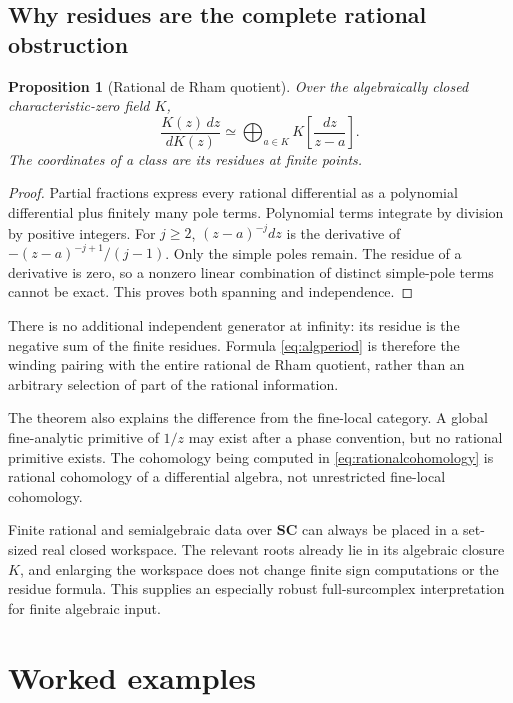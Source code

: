 \documentclass[11pt,letterpaper]{article}
\newtheorem{proposition}[theorem]{Proposition}
\theoremstyle{definition}
\theoremstyle{remark}
\newcommand{\SC}{\mathbf{SC}}
\numberwithin{equation}{section}
\begin{document}
\subsection{Why residues are the complete rational obstruction}
\begin{proposition}[Rational de Rham quotient]\label{prop:rationalcohomology}
Over the algebraically closed characteristic-zero field $K$,
\begin{equation}\label{eq:rationalcohomology}
\frac{K(z)\,dz}{dK(z)}
\simeq\bigoplus_{a\in K}K\left[\frac{dz}{z-a}\right].
\end{equation}
The coordinates of a class are its residues at finite points.
\end{proposition}
\begin{proof}
Partial fractions express every rational differential as a polynomial differential plus finitely many pole terms. Polynomial terms integrate by division by positive integers. For $j\ge2$, $(z-a)^{-j}dz$ is the derivative of $-(z-a)^{-j+1}/(j-1)$. Only the simple poles remain. The residue of a derivative is zero, so a nonzero linear combination of distinct simple-pole terms cannot be exact. This proves both spanning and independence.
\end{proof}
There is no additional independent generator at infinity: its residue is the negative sum of the finite residues. Formula \eqref{eq:algperiod} is therefore the winding pairing with the entire rational de Rham quotient, rather than an arbitrary selection of part of the rational information.

The theorem also explains the difference from the fine-local category. A global fine-analytic primitive of $1/z$ may exist after a phase convention, but no rational primitive exists. The cohomology being computed in \eqref{eq:rationalcohomology} is rational cohomology of a differential algebra, not unrestricted fine-local cohomology.

Finite rational and semialgebraic data over $\SC$ can always be placed in a set-sized real closed workspace. The relevant roots already lie in its algebraic closure $K$, and enlarging the workspace does not change finite sign computations or the residue formula. This supplies an especially robust full-surcomplex interpretation for finite algebraic input.

\section{Worked examples}\label{sec:examples}
\end{document}
